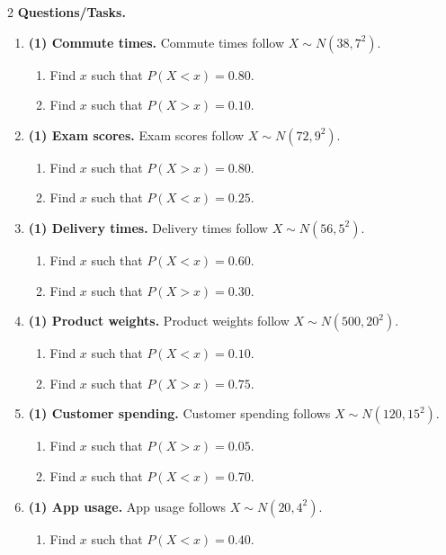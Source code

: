\begin{multicols}{2}
\textbf{Questions/Tasks.}
\begin{enumerate}[label=\textbf{\arabic*)}]
    \item \textbf{(1) Commute times.} Commute times follow \(X\sim N(38,7^2)\).
    \begin{enumerate}[label=\textbf{\alph*)}]
        \item Find \(x\) such that \(P(X<x)=0.80\).
        \item Find \(x\) such that \(P(X>x)=0.10\).
    \end{enumerate}
    \item \textbf{(1) Exam scores.} Exam scores follow \(X\sim N(72,9^2)\).
    \begin{enumerate}[label=\textbf{\alph*)}]
        \item Find \(x\) such that \(P(X>x)=0.80\).
        \item Find \(x\) such that \(P(X<x)=0.25\).
    \end{enumerate}
    \item \textbf{(1) Delivery times.} Delivery times follow \(X\sim N(56,5^2)\).
    \begin{enumerate}[label=\textbf{\alph*)}]
        \item Find \(x\) such that \(P(X<x)=0.60\).
        \item Find \(x\) such that \(P(X>x)=0.30\).
    \end{enumerate}
    \item \textbf{(1) Product weights.} Product weights follow \(X\sim N(500,20^2)\).
    \begin{enumerate}[label=\textbf{\alph*)}]
        \item Find \(x\) such that \(P(X<x)=0.10\).
        \item Find \(x\) such that \(P(X>x)=0.75\).
    \end{enumerate}
    \item \textbf{(1) Customer spending.} Customer spending follows \(X\sim N(120,15^2)\).
    \begin{enumerate}[label=\textbf{\alph*)}]
        \item Find \(x\) such that \(P(X>x)=0.05\).
        \item Find \(x\) such that \(P(X<x)=0.70\).
    \end{enumerate}
    \item \textbf{(1) App usage.} App usage follows \(X\sim N(20,4^2)\).
    \begin{enumerate}[label=\textbf{\alph*)}]
        \item Find \(x\) such that \(P(X<x)=0.40\).

\end{enumerate}
\end{enumerate}
\end{multicols}
